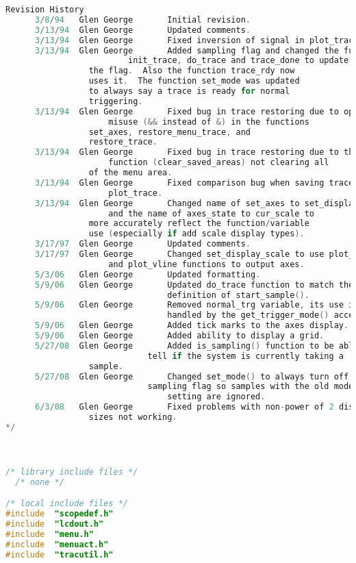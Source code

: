 \begin{lstlisting}[language=C]
   Revision History
      3/8/94   Glen George       Initial revision.
      3/13/94  Glen George       Updated comments.
      3/13/94  Glen George       Fixed inversion of signal in plot_trace.
      3/13/94  Glen George       Added sampling flag and changed the functions
      			    	 init_trace, do_trace and trace_done to update
				 the flag.  Also the function trace_rdy now
				 uses it.  The function set_mode was updated
				 to always say a trace is ready for normal
				 triggering.
      3/13/94  Glen George       Fixed bug in trace restoring due to operator
			         misuse (&& instead of &) in the functions
				 set_axes, restore_menu_trace, and
				 restore_trace.
      3/13/94  Glen George       Fixed bug in trace restoring due to the clear
			         function (clear_saved_areas) not clearing all
				 of the menu area.
      3/13/94  Glen George       Fixed comparison bug when saving traces in
			         plot_trace.
      3/13/94  Glen George       Changed name of set_axes to set_display_scale
			         and the name of axes_state to cur_scale to
				 more accurately reflect the function/variable
				 use (especially if add scale display types).
      3/17/97  Glen George       Updated comments.
      3/17/97  Glen George       Changed set_display_scale to use plot_hline
			         and plot_vline functions to output axes.
      5/3/06   Glen George       Updated formatting.
      5/9/06   Glen George       Updated do_trace function to match the new
                                 definition of start_sample().
      5/9/06   Glen George       Removed normal_trg variable, its use is now
                                 handled by the get_trigger_mode() accessor.
      5/9/06   Glen George       Added tick marks to the axes display.
      5/9/06   Glen George       Added ability to display a grid.
      5/27/08  Glen George       Added is_sampling() function to be able to
	                         tell if the system is currently taking a
				 sample.
      5/27/08  Glen George       Changed set_mode() to always turn off the
	                         sampling flag so samples with the old mode
                                 setting are ignored.
      6/3/08   Glen George       Fixed problems with non-power of 2 display
				 sizes not working.
*/



/* library include files */
  /* none */

/* local include files */
#include  "scopedef.h"
#include  "lcdout.h"
#include  "menu.h"
#include  "menuact.h"
#include  "tracutil.h"





\end{lstlisting}
